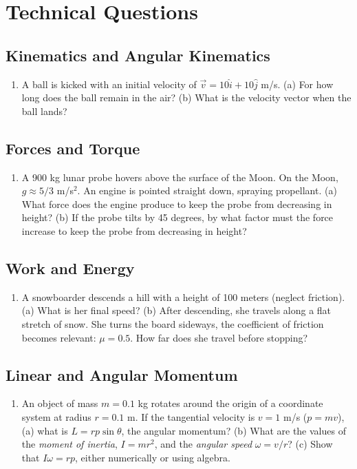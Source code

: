 \documentclass[10pt]{article}
\begin{document}
\section{Technical Questions}
\subsection{Kinematics and Angular Kinematics}
\begin{enumerate}
\item A ball is kicked with an initial velocity of $\vec{v} = 10\hat{i}+10\hat{j}$ m/s. (a) For how long does the ball remain in the air?  (b) What is the velocity vector when the ball lands? \\ \vspace{1.5cm}
\end{enumerate}
\subsection{Forces and Torque}
\begin{enumerate}
\item A 900 kg lunar probe hovers above the surface of the Moon.  On the Moon, $g \approx 5/3$ m/s$^2$.  An engine is pointed straight down, spraying propellant.  (a) What force does the engine produce to keep the probe from decreasing in height?  (b) If the probe tilts by 45 degrees, by what factor must the force increase to keep the probe from decreasing in height? \\ \vspace{1.5cm}
\end{enumerate}
\subsection{Work and Energy}
\begin{enumerate}
\item A snowboarder descends a hill with a height of 100 meters (neglect friction).  (a) What is her final speed?  (b) After descending, she travels along a flat stretch of snow.  She turns the board sideways, the coefficient of friction becomes relevant: $\mu = 0.5$.  How far does she travel before stopping? \\ \vspace{1.5cm}
\end{enumerate}
\subsection{Linear and Angular Momentum}
\begin{enumerate}
\item An object of mass $m = 0.1$ kg rotates around the origin of a coordinate system at radius $r = 0.1$ m.  If the tangential velocity is $v = 1$ m/s ($p = mv$), (a) what is $L = rp\sin\theta$, the angular momentum?  (b) What are the values of the \textit{moment of inertia}, $I = mr^2$, and the \textit{angular speed} $\omega = v/r$?  (c) Show that $I\omega = rp$, either numerically or using algebra.
\end{enumerate}
\end{document}
